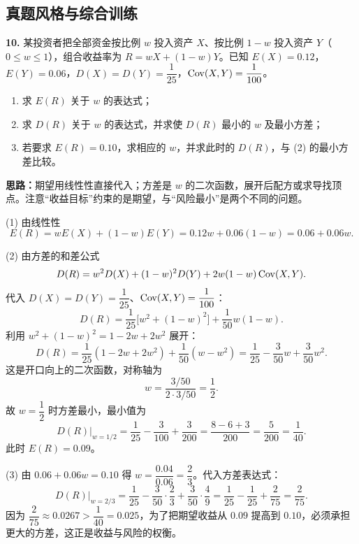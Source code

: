 \else \answerarea[10] \fi

\subsection{真题风格与综合训练}

\textbf{10.} 某投资者把全部资金按比例 $w$ 投入资产 $X$、按比例 $1-w$ 投入资产 $Y$（$0\le w\le1$），组合收益率为 $R=wX+(1-w)Y$。已知 $E(X)=0.12$，$E(Y)=0.06$，$D(X)=D(Y)=\dfrac1{25}$，$\operatorname{Cov}(X,Y)=\dfrac1{100}$。
\begin{enumerate}[label=(\arabic*)]
    \item 求 $E(R)$ 关于 $w$ 的表达式；
    \item 求 $D(R)$ 关于 $w$ 的表达式，并求使 $D(R)$ 最小的 $w$ 及最小方差；
    \item 若要求 $E(R)=0.10$，求相应的 $w$，并求此时的 $D(R)$，与 (2) 的最小方差比较。
\end{enumerate}

\ifshowsolutions%
\textbf{思路：}期望用线性性直接代入；方差是 $w$ 的二次函数，展开后配方或求导找顶点。注意“收益目标”约束的是期望，与“风险最小”是两个不同的问题。

(1) 由线性性
\[
E(R)=wE(X)+(1-w)E(Y)=0.12w+0.06(1-w)=0.06+0.06w.
\]

(2) 由方差的和差公式
\[
D(R)=w^2D(X)+(1-w)^2D(Y)+2w(1-w)\operatorname{Cov}(X,Y).
\]
代入 $D(X)=D(Y)=\dfrac1{25}$、$\operatorname{Cov}(X,Y)=\dfrac1{100}$：
\[
D(R)=\frac1{25}\bigl[w^2+(1-w)^2\bigr]+\frac1{50}w(1-w).
\]
利用 $w^2+(1-w)^2=1-2w+2w^2$ 展开：
\[
D(R)=\frac1{25}(1-2w+2w^2)+\frac1{50}(w-w^2)
=\frac1{25}-\frac{3}{50}w+\frac{3}{50}w^2.
\]
这是开口向上的二次函数，对称轴为
\[
w=\frac{3/50}{2\cdot3/50}=\frac12.
\]
故 $w=\dfrac12$ 时方差最小，最小值为
\[
D(R)\Big|_{w=1/2}=\frac1{25}-\frac{3}{100}+\frac{3}{200}
=\frac{8-6+3}{200}=\frac{5}{200}=\frac1{40}.
\]
此时 $E(R)=0.09$。

(3) 由 $0.06+0.06w=0.10$ 得 $w=\dfrac{0.04}{0.06}=\dfrac23$。代入方差表达式：
\[
D(R)\Big|_{w=2/3}
=\frac1{25}-\frac{3}{50}\cdot\frac23+\frac{3}{50}\cdot\frac49
=\frac1{25}-\frac1{25}+\frac{2}{75}
=\frac{2}{75}.
\]
因为 $\dfrac{2}{75}\approx0.0267>\dfrac1{40}=0.025$，为了把期望收益从 $0.09$ 提高到 $0.10$，必须承担更大的方差，这正是收益与风险的权衡。


\else \answerarea[10] \fi

